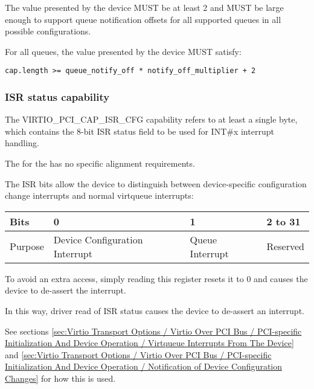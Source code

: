 The value  presented by the device MUST be at least 2
and MUST be large enough to support queue notification offsets
for all supported queues in all possible configurations.

For all queues, the value  presented by the device MUST satisfy:
\begin{lstlisting}
cap.length >= queue_notify_off * notify_off_multiplier + 2
\end{lstlisting}

\subsubsection{ISR status capability}\label{sec:Virtio Transport Options / Virtio Over PCI Bus / PCI Device Layout / ISR status capability}

The VIRTIO_PCI_CAP_ISR_CFG capability
refers to at least a single byte, which contains the 8-bit ISR status field
to be used for INT\#x interrupt handling.

The  for the  has no specific alignment requirements.

The ISR bits allow the device to distinguish between device-specific configuration
change interrupts and normal virtqueue interrupts:

\begin{tabular}{ |l||l|l|l| }
\hline
Bits       & 0                               & 1               &  2 to 31 \\
\hline
Purpose    & Device Configuration Interrupt  & Queue Interrupt & Reserved \\
\hline
\end{tabular}

To avoid an extra access, simply reading this register resets it to 0 and
causes the device to de-assert the interrupt.

In this way, driver read of ISR status causes the device to de-assert
an interrupt.

See sections \ref{sec:Virtio Transport Options / Virtio Over PCI Bus / PCI-specific Initialization And Device Operation / Virtqueue Interrupts From The Device} and \ref{sec:Virtio Transport Options / Virtio Over PCI Bus / PCI-specific Initialization And Device Operation / Notification of Device Configuration Changes} for how this is used.


